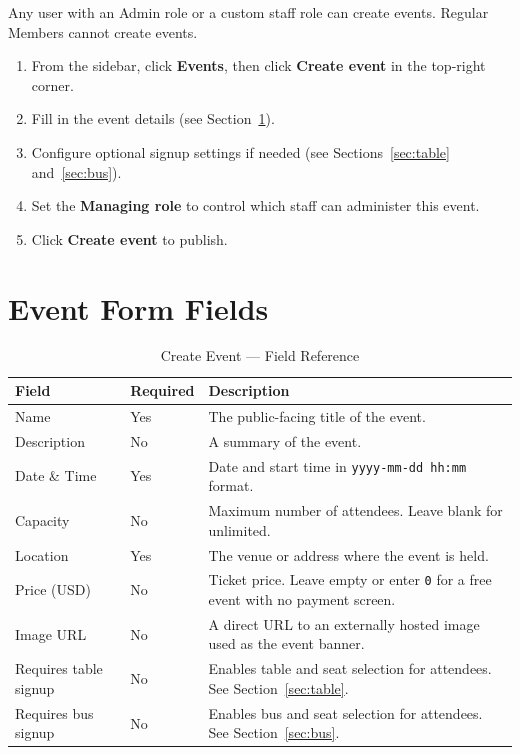 \documentclass[12pt, twoside]{report}
\newcommand{\uielem}[1]{\textbf{#1}}
\begin{document}
Any user with an Admin role or a custom staff role can create events.
Regular Members cannot create events.

\begin{enumerate}
  \item From the sidebar, click \uielem{Events}, then click
        \uielem{Create event} in the top-right corner.
  \item Fill in the event details (see Section~\ref{sec:eventfields}).
  \item Configure optional signup settings if needed
        (see Sections~\ref{sec:table} and~\ref{sec:bus}).
  \item Set the \uielem{Managing role} to control which staff can
        administer this event.
  \item Click \uielem{Create event} to publish.
\end{enumerate}

\section{Event Form Fields}
\label{sec:eventfields}

\begin{table}[H]
  \centering
  \caption{Create Event --- Field Reference}
  \begin{tabular}{@{} p{3cm} p{1.5cm} p{8cm} @{}}
    \toprule
    \textbf{Field} & \textbf{Required} & \textbf{Description} \\
    \midrule
    Name        & Yes & The public-facing title of the event. \\
    Description & No  & A summary of the event. \\
    Date \& Time & Yes & Date and start time in \texttt{yyyy-mm-dd hh:mm} format. \\
    Capacity    & No  & Maximum number of attendees. Leave blank for unlimited. \\
    Location    & Yes & The venue or address where the event is held. \\
    Price (USD) & No  & Ticket price. Leave empty or enter \texttt{0} for a
                        free event with no payment screen. \\
    Image URL   & No  & A direct URL to an externally hosted image used as
                        the event banner. \\
    Requires table signup & No & Enables table and seat selection for
                                  attendees. See Section~\ref{sec:table}. \\
    Requires bus signup   & No & Enables bus and seat selection for
                                  attendees. See Section~\ref{sec:bus}. \\
    \bottomrule
  \end{tabular}
\end{table}
\end{document}
